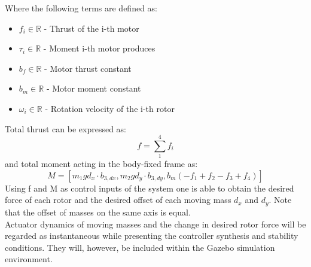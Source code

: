 \noindent Where the following terms are defined as:

\begin{itemize}
	\item $f_i \in \mathbb{R}$ - Thrust of the i-th motor
	
	\item $\tau_i \in \mathbb{R}$ - Moment i-th motor produces
	
	\item $b_f \in \mathbb{R}$ - Motor thrust constant
	
	\item $b_m \in \mathbb{R}$ - Motor moment constant
	
	\item $\omega_i \in \mathbb{R}$ - Rotation velocity of the i-th rotor
\end{itemize}

Total thrust can be expressed as:
\begin{equation}
	f = \sum_{1}^{4}f_i
\end{equation}
and total moment acting in the body-fixed frame as:
\begin{equation}
	M = [m_{1}gd_x \cdot b_{3,dx} ,m_{2}gd_y \cdot b_{3,dy},b_m(-f_1 + f_2 - f_3 + f_4)]
\end{equation}
Using f and M as control inputs of the system one is able to obtain the desired force of each rotor and the desired offset of each moving mass $d_x$ and $d_y$. Note that the offset of masses on the same axis is equal. \\
Actuator dynamics of moving masses and the change in desired rotor force will be regarded as instantaneous while presenting the controller synthesis and stability conditions. They will, however, be included within the Gazebo simulation environment.